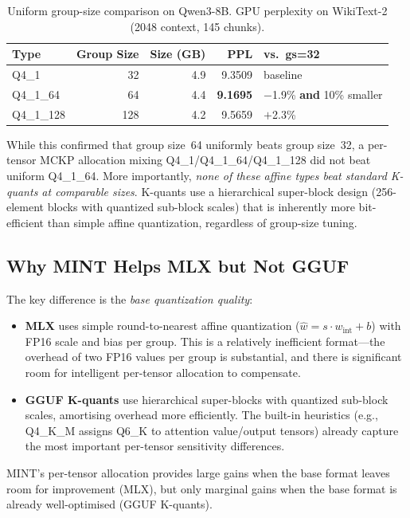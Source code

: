 \documentclass{article}
\begin{document}
\begin{table}[h]
\centering
\caption{Uniform group-size comparison on Qwen3-8B. GPU perplexity on WikiText-2 (2048 context, 145 chunks).}
\label{tab:group_size}
\begin{tabular}{lrrrl}
\toprule
\textbf{Type} & \textbf{Group Size} & \textbf{Size (GB)} & \textbf{PPL} & \textbf{vs.\ gs=32} \\
\midrule
Q4\_1 & 32 & 4.9 & 9.3509 & baseline \\
Q4\_1\_64 & 64 & 4.4 & \textbf{9.1695} & $-$1.9\% \textbf{and} 10\% smaller \\
Q4\_1\_128 & 128 & 4.2 & 9.5659 & $+$2.3\% \\
\bottomrule
\end{tabular}
\end{table}

While this confirmed that group size~64 uniformly beats group size~32, a per-tensor MCKP allocation mixing Q4\_1/Q4\_1\_64/Q4\_1\_128 did not beat uniform Q4\_1\_64. More importantly, \emph{none of these affine types beat standard K-quants at comparable sizes}. K-quants use a hierarchical super-block design (256-element blocks with quantized sub-block scales) that is inherently more bit-efficient than simple affine quantization, regardless of group-size tuning.

\subsection{Why MINT Helps MLX but Not GGUF}

The key difference is the \emph{base quantization quality}:

\begin{itemize}
    \item \textbf{MLX} uses simple round-to-nearest affine quantization ($\hat{w} = s \cdot w_{\text{int}} + b$) with FP16 scale and bias per group. This is a relatively inefficient format---the overhead of two FP16 values per group is substantial, and there is significant room for intelligent per-tensor allocation to compensate.
    \item \textbf{GGUF K-quants} use hierarchical super-blocks with quantized sub-block scales, amortising overhead more efficiently. The built-in heuristics (e.g., Q4\_K\_M assigns Q6\_K to attention value/output tensors) already capture the most important per-tensor sensitivity differences.
\end{itemize}

MINT's per-tensor allocation provides large gains when the base format leaves room for improvement (MLX), but only marginal gains when the base format is already well-optimised (GGUF K-quants).
\end{document}
